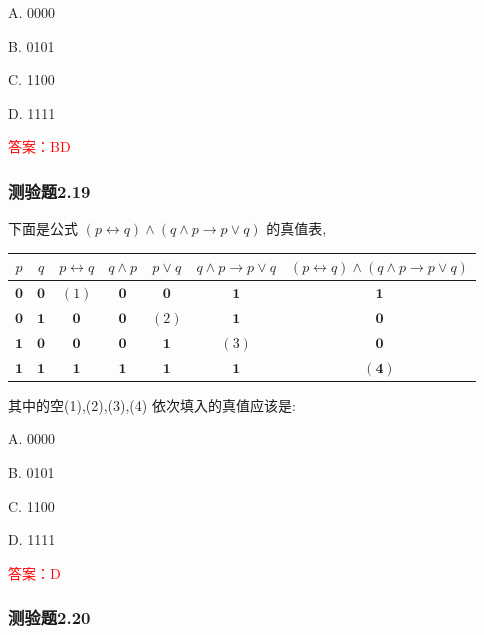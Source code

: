 \documentclass[UTF8, heading=true]{ctexart}
\begin{document}
A. 0000

B. 0101

C. 1100

D. 1111

\textcolor{red}{答案：BD}

\subsubsection{测验题2.19}

下面是公式 $(p \leftrightarrow q) \wedge(q \wedge p \rightarrow p \vee q)$ 的真值表,


\begin{table}[htbp]
\centering
\begin{tabular}{c|c|c|c|c|c|c}
\hline$p$ & $q$ & $p \leftrightarrow q$ & $q \wedge p$ & $p \vee q$ & $q \wedge p \rightarrow p \vee q$ & $(p \leftrightarrow q) \wedge(q \wedge p \rightarrow p \vee q)$ \\
\hline $\mathbf{0}$ & $\mathbf{0}$ & $(1)$ & $\mathbf{0}$ & $\mathbf{0}$ & $\mathbf{1}$ & $\mathbf{1}$ \\
\hline $\mathbf{0}$ & $\mathbf{1}$ & $\mathbf{0}$ & $\mathbf{0}$ & $(2)$ & $\mathbf{1}$ & $\mathbf{0}$ \\
\hline $\mathbf{1}$ & $\mathbf{0}$ & $\mathbf{0}$ & $\mathbf{0}$ & $\mathbf{1}$ & $(3)$ & $\mathbf{0}$ \\
\hline $\mathbf{1}$ & $\mathbf{1}$ & $\mathbf{1}$ & $\mathbf{1}$ & $\mathbf{1}$ & $\mathbf{1}$ & $\mathbf{( 4 )}$ \\
\hline
\end{tabular}
\end{table}

其中的空(1),(2),(3),(4) 依次填入的真值应该是:

A. 0000

B. 0101

C. 1100

D. 1111

\textcolor{red}{答案：D}

\subsubsection{测验题2.20}
\end{document}
